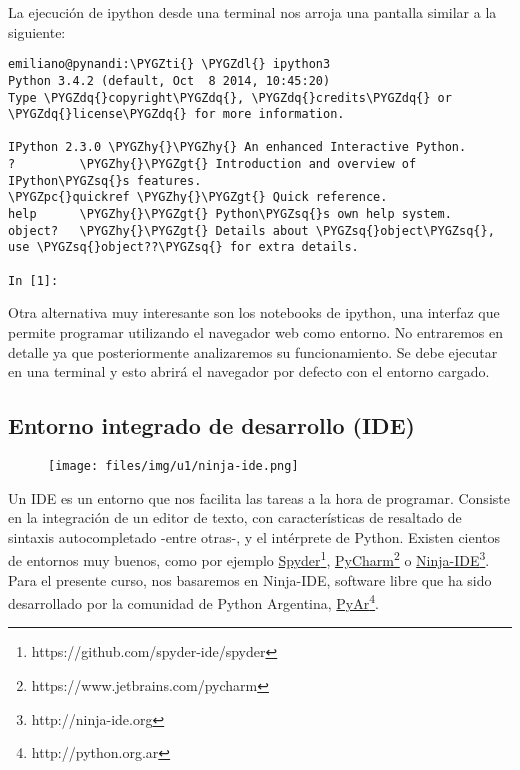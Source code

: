 \documentclass[a4paper,12pt,spanish]{sphinxmanual}
\def\PYGZgt{\char`\>}
\def\PYGZpc{\char`\%}
\def\PYGZdl{\char`\$}
\def\PYGZhy{\char`\-}
\def\PYGZsq{\char`\'}
\def\PYGZdq{\char`\"}
\def\PYGZti{\char`\~}
\renewcommand\PYGZsq{\textquotesingle}
\begin{document}
La ejecución de ipython desde una terminal nos arroja una pantalla
similar a la siguiente:

\begin{Verbatim}[commandchars=\\\{\}]
emiliano@pynandi:\PYGZti{} \PYGZdl{} ipython3
Python 3.4.2 (default, Oct  8 2014, 10:45:20)
Type \PYGZdq{}copyright\PYGZdq{}, \PYGZdq{}credits\PYGZdq{} or \PYGZdq{}license\PYGZdq{} for more information.

IPython 2.3.0 \PYGZhy{}\PYGZhy{} An enhanced Interactive Python.
?         \PYGZhy{}\PYGZgt{} Introduction and overview of IPython\PYGZsq{}s features.
\PYGZpc{}quickref \PYGZhy{}\PYGZgt{} Quick reference.
help      \PYGZhy{}\PYGZgt{} Python\PYGZsq{}s own help system.
object?   \PYGZhy{}\PYGZgt{} Details about \PYGZsq{}object\PYGZsq{}, use \PYGZsq{}object??\PYGZsq{} for extra details.

In [1]:
\end{Verbatim}

Otra alternativa muy interesante son los notebooks de ipython, una
interfaz que permite programar utilizando el navegador web como entorno.
No entraremos en detalle ya que posteriormente analizaremos su
funcionamiento. Se debe ejecutar en una terminal  y
esto abrirá el navegador por defecto con el entorno cargado.


\subsection{Entorno integrado de desarrollo (IDE)}
\label{Unidad01:entorno-integrado-de-desarrollo-ide}\begin{figure}[htbp]
\centering

\texttt{[image: files/img/u1/ninja-ide.png]}
\end{figure}

Un IDE es un entorno que nos facilita las tareas a la hora de programar.
Consiste en la integración de un editor de texto, con características de
resaltado de sintaxis autocompletado -entre otras-, y el intérprete de
Python. Existen cientos de entornos muy buenos, como por ejemplo
\href{https://github.com/spyder-ide/spyder}{Spyder}\footnote{https://github.com/spyder-ide/spyder},
\href{https://www.jetbrains.com/pycharm}{PyCharm}\footnote{https://www.jetbrains.com/pycharm} o
\href{http://ninja-ide.org}{Ninja-IDE}\footnote{http://ninja-ide.org}. Para el presente curso, nos
basaremos en Ninja-IDE, software libre que ha sido desarrollado por la
comunidad de Python Argentina, \href{http://python.org.ar}{PyAr}\footnote{http://python.org.ar}.
\end{document}
